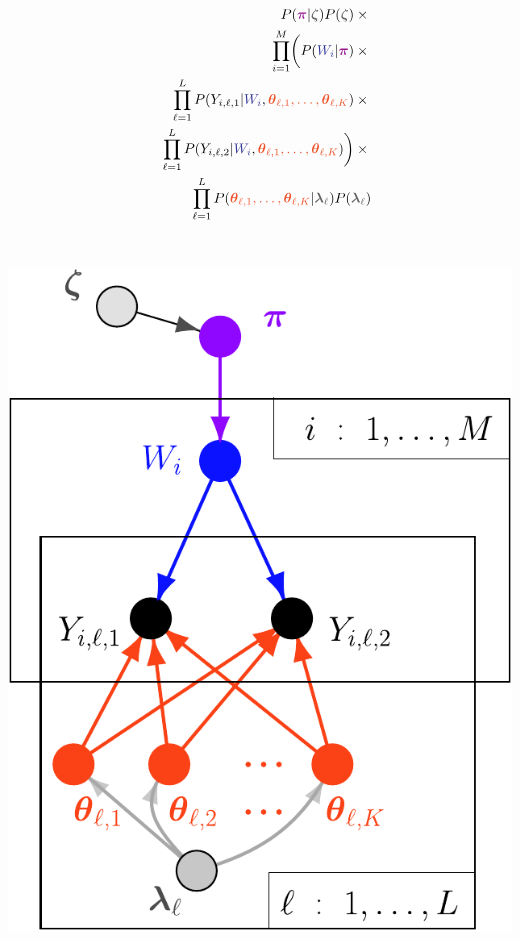 \begin{minipage}{.45\textwidth}
\begin{eqnarray*}
& & P(\tc{pipurple}{\bm{\pi}}|\tc{priorgray}{\bm{\zeta}})P(\tc{priorgray}{\bm{\zeta}})\times 
\mbox{}\\
& &\prod_{i=1}^M   \biggl( P(\tc{wblue}{W_i}|\tc{pipurple}{\bm{\pi}})  
\times 
\mbox{} \\
& & \prod_{\ell=1}^L
P(Y_{i,\ell,1}|\tc{wblue}{W_i},\tc{thetaorange}{\bm{\theta}_{\ell,1},
\ldots,\bm{\theta}_{\ell,K}})  \times \mbox{} \\
& & \prod_{\ell=1}^L
P(Y_{i,\ell,2}|\tc{wblue}{W_i},\tc{thetaorange}{\bm{\theta}_{\ell,1},
\ldots,\bm{\theta}_{\ell,K}}) \biggr) \times \mbox{} \\
& & 
\prod_{\ell=1}^L
P(\tc{thetaorange}{\bm{\theta}_{\ell,1},
\ldots,\bm{\theta}_{\ell,K}} | \tc{priorgray}{\bm{\lambda}_\ell})P(\tc{priorgray}{\bm{\lambda}_\ell})
\end{eqnarray*}
\vfill

\end{minipage}~~~~~~
\hfill
\begin{minipage}{.475\textwidth}
\vfill
\hfill\includegraphics*[width=.82\textwidth]{illus/mixfishDAGcolor.pdf}
\vfill
\end{minipage}



